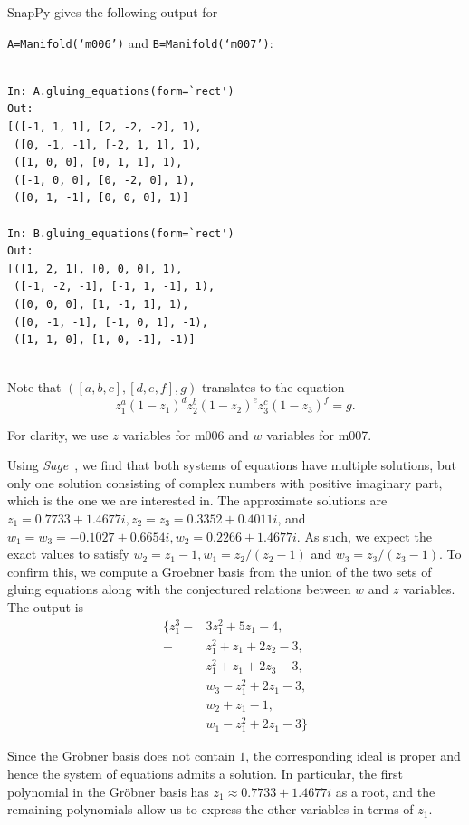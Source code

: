 \documentclass[a4paper]{gtart}
\theoremstyle{definition}
\theoremstyle{remark}
\numberwithin{equation}{section}
\begin{document}
SnapPy gives the following output for

 \texttt{A=Manifold(`m006')}
and \texttt{B=Manifold(`m007')}:

\begin{verbatim}

In: A.gluing_equations(form=`rect')
Out: 
[([-1, 1, 1], [2, -2, -2], 1),
 ([0, -1, -1], [-2, 1, 1], 1),
 ([1, 0, 0], [0, 1, 1], 1),
 ([-1, 0, 0], [0, -2, 0], 1),
 ([0, 1, -1], [0, 0, 0], 1)]

In: B.gluing_equations(form=`rect')
Out: 
[([1, 2, 1], [0, 0, 0], 1),
 ([-1, -2, -1], [-1, 1, -1], 1),
 ([0, 0, 0], [1, -1, 1], 1),
 ([0, -1, -1], [-1, 0, 1], -1),
 ([1, 1, 0], [1, 0, -1], -1)]
 
\end{verbatim}


Note that $(\left[a,b,c\right],\left[d,e,f\right],g)$ translates to the equation 
\[ z_1^a (1-z_1)^d z_2^b (1-z_2)^e z_3^c (1-z_3)^f = g.\]


For clarity, we use $z$ variables for m006 and $w$ variables for m007.

Using \textit{Sage}~\cite{sage}, we find that both systems of equations have multiple solutions, but only one solution consisting of complex numbers with positive imaginary part, which is the one we are interested in. The approximate solutions are $z_1=0.7733+1.4677i, z_2=z_3=0.3352+0.4011i$, and $w_1=w_3=-0.1027+0.6654i, w_2=0.2266+1.4677i$. As such, we expect the exact values to satisfy $w_2=z_1-1, w_1=z_2/(z_2-1)$ and $w_3=z_3/(z_3-1)$. To confirm this, we compute a Groebner basis from the union of the two sets of gluing equations along with the conjectured relations between $w$ and $z$ variables. The output is
\begin{align*}
    \{z_1^3-&3 z_1^2+5 z_1-4,\\
    -&z_1^2+z_1+2 z_2-3,\\
    -&z_1^2+z_1+2 z_3-3,\\
    &w_3-z_1^2+2 z_1-3,\\
    &w_2+z_1-1,\\
    &w_1-z_1^2+2 z_1-3\}
\end{align*}

Since the Gr\"obner basis does not contain $1$, the corresponding ideal is proper and hence the system of equations admits a solution. In particular, the first polynomial in the Gr\"obner basis has $z_1\approx 0.7733+1.4677i$ as a root, and the remaining polynomials allow us to express the other variables in terms of $z_1$.
\end{document}
